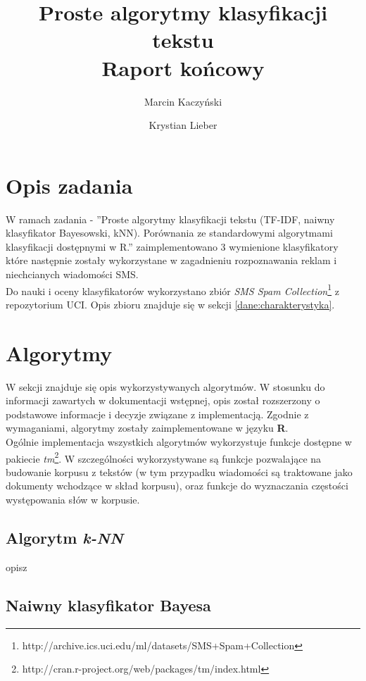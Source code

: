 \documentclass[a4paper,12pt]{article}
\title{Proste algorytmy klasyfikacji tekstu \\ Raport końcowy}
\author{Marcin Kaczyński \and Krystian Lieber}
\begin{document}
\lstset{style=customr}

\maketitle

\section{Opis zadania} 

W ramach zadania - ''Proste algorytmy klasyfikacji tekstu (TF-IDF, naiwny klasyfikator Bayesowski, kNN). Porównania ze standardowymi algorytmami klasyfikacji dostępnymi w R.'' zaimplementowano 3 wymienione klasyfikatory które następnie zostały wykorzystane w zagadnieniu rozpoznawania reklam i niechcianych wiadomości SMS.\\

Do nauki i oceny klasyfikatorów wykorzystano zbiór \textit{SMS Spam Collection}\footnote{http://archive.ics.uci.edu/ml/datasets/SMS+Spam+Collection} z repozytorium UCI. Opis zbioru znajduje się w sekcji \ref{dane:charakterystyka}.

\section{Algorytmy}

W sekcji znajduje się opis wykorzystywanych algorytmów. W stosunku do informacji zawartych w dokumentacji wstępnej, opis został rozszerzony o 
podstawowe informacje i decyzje związane z implementacją. Zgodnie z wymaganiami, algorytmy zostały zaimplementowane w języku \textbf{R}.\\

Ogólnie implementacja wszystkich algorytmów wykorzystuje funkcje dostępne w pakiecie \textit{tm}\footnote{http://cran.r-project.org/web/packages/tm/index.html}. W szczególności wykorzystywane są funkcje pozwalające na budowanie korpusu z tekstów (w tym przypadku wiadomości są traktowane jako dokumenty wchodzące w skład korpusu), oraz funkcje do wyznaczania częstości występowania słów w korpusie.

\subsection{Algorytm \textit{k-NN}}

opisz

\subsection{Naiwny klasyfikator Bayesa}
\end{document}
